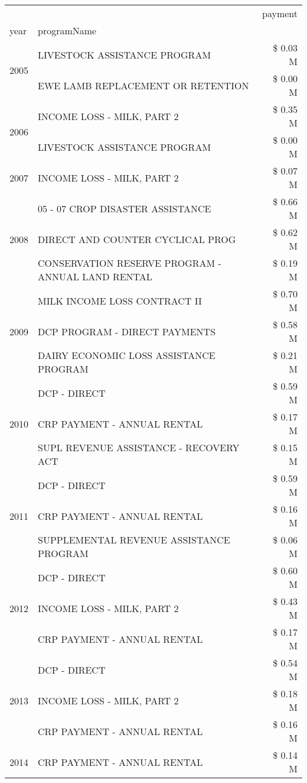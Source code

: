 \begin{tabular}{llr}
\toprule
 &  & payment \\
year & programName &  \\
\midrule
\multirow[t]{2}{*}{2005} & LIVESTOCK ASSISTANCE PROGRAM & \$ 0.03 M \\
 & EWE LAMB REPLACEMENT OR RETENTION & \$ 0.00 M \\
\cline{1-3}
\multirow[t]{2}{*}{2006} & INCOME LOSS - MILK, PART 2 & \$ 0.35 M \\
 & LIVESTOCK ASSISTANCE PROGRAM & \$ 0.00 M \\
\cline{1-3}
2007 & INCOME LOSS - MILK, PART 2 & \$ 0.07 M \\
\cline{1-3}
\multirow[t]{3}{*}{2008} & 05 - 07 CROP DISASTER ASSISTANCE & \$ 0.66 M \\
 & DIRECT AND COUNTER CYCLICAL PROG & \$ 0.62 M \\
 & CONSERVATION RESERVE PROGRAM - ANNUAL LAND RENTAL & \$ 0.19 M \\
\cline{1-3}
\multirow[t]{3}{*}{2009} & MILK INCOME LOSS CONTRACT II & \$ 0.70 M \\
 & DCP PROGRAM - DIRECT PAYMENTS & \$ 0.58 M \\
 & DAIRY ECONOMIC LOSS ASSISTANCE PROGRAM & \$ 0.21 M \\
\cline{1-3}
\multirow[t]{3}{*}{2010} & DCP - DIRECT & \$ 0.59 M \\
 & CRP PAYMENT - ANNUAL RENTAL & \$ 0.17 M \\
 & SUPL REVENUE ASSISTANCE - RECOVERY ACT & \$ 0.15 M \\
\cline{1-3}
\multirow[t]{3}{*}{2011} & DCP - DIRECT & \$ 0.59 M \\
 & CRP PAYMENT - ANNUAL RENTAL & \$ 0.16 M \\
 & SUPPLEMENTAL REVENUE ASSISTANCE PROGRAM & \$ 0.06 M \\
\cline{1-3}
\multirow[t]{3}{*}{2012} & DCP - DIRECT & \$ 0.60 M \\
 & INCOME LOSS - MILK, PART 2 & \$ 0.43 M \\
 & CRP PAYMENT - ANNUAL RENTAL & \$ 0.17 M \\
\cline{1-3}
\multirow[t]{3}{*}{2013} & DCP - DIRECT & \$ 0.54 M \\
 & INCOME LOSS - MILK, PART 2 & \$ 0.18 M \\
 & CRP PAYMENT - ANNUAL RENTAL & \$ 0.16 M \\
\cline{1-3}
\multirow[t]{3}{*}{2014} & CRP PAYMENT - ANNUAL RENTAL & \$ 0.14 M \\

\end{tabular}
